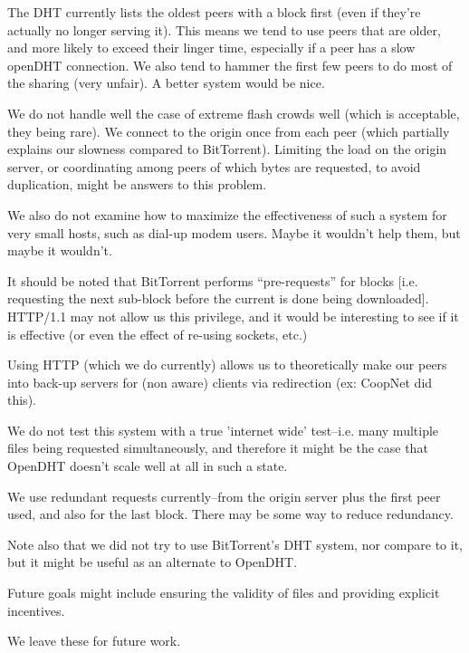 The DHT currently lists the oldest peers with a block first (even if they're actually no longer serving it).  This means we tend to use peers that are older, and more likely to exceed their linger time, especially if a peer has a slow openDHT connection.  We also tend to hammer the first few peers to do most of the sharing (very unfair).  A better system would be nice.  

We do not handle well the case of extreme flash crowds well (which is acceptable, they being rare).  We connect to the origin once from each peer (which partially explains our slowness compared to BitTorrent). Limiting the load on the origin server, or coordinating among peers of which bytes are requested, to avoid duplication, might be answers to this problem.

We also do not examine how to maximize the effectiveness of such a system for very small hosts, such as dial-up modem users.  Maybe it wouldn't help them, but maybe it wouldn't.

It should be noted that BitTorrent performs ``pre-requests'' for blocks [i.e. requesting the next sub-block before the current is done being downloaded].    HTTP/1.1 may not allow us this privilege, and it would be interesting to see if it is effective (or even the effect of re-using sockets, etc.)

Using HTTP (which we do currently) allows us to theoretically make our peers into back-up servers for (non aware) clients via redirection (ex: CoopNet did this).

We do not test this system with a true 'internet wide' test--i.e. many multiple files being requested simultaneously, and therefore it might be the case that OpenDHT doesn't scale well at all in such a state.

We use redundant requests currently--from the origin server plus the first peer used, and also for the last block.  There may be some way to reduce redundancy.

Note also that we did not try to use BitTorrent's DHT system, nor compare to it, but it might be useful as an alternate to OpenDHT.

Future goals might include ensuring the validity of files and providing explicit incentives.

We leave these for future work.
